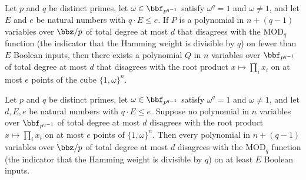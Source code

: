 \begin{theorem}
\label{RazborovSmolensky.padded_modQ_approx_transfers_to_rootProduct}
\leanok
{}
Let $p$ and $q$ be distinct primes, let $\omega \in \bbf_{p^{q-1}}$ satisfy
$\omega^q = 1$ and $\omega \neq 1$, and let $E$ and $e$ be natural numbers with
$q \cdot E \le e$.  If $P$ is a polynomial in $n + (q-1)$ variables over $\bbz/p$ of
total degree at most $d$ that disagrees with the $\mathrm{MOD}_q$ function (the
indicator that the Hamming weight is divisible by $q$) on fewer than $E$ Boolean inputs,
then there exists a polynomial $Q$ in $n$ variables over $\bbf_{p^{q-1}}$ of total
degree at most $d$ that disagrees with the root product $x \mapsto \prod_i x_i$ on at
most $e$ points of the cube $\{1,\omega\}^n$.
\end{theorem}

\begin{theorem}
\label{RazborovSmolensky.modQ_lowDegreeBadCountLB_from_rootProduct}
\leanok
{}
Let $p$ and $q$ be distinct primes, let $\omega \in \bbf_{p^{q-1}}$ satisfy
$\omega^q = 1$ and $\omega \neq 1$, and let $d, E, e$ be natural numbers with
$q \cdot E \le e$.  Suppose no polynomial in $n$ variables over $\bbf_{p^{q-1}}$ of
total degree at most $d$ disagrees with the root product $x \mapsto \prod_i x_i$ on at
most $e$ points of $\{1,\omega\}^n$.  Then every polynomial in $n + (q-1)$ variables
over $\bbz/p$ of total degree at most $d$ disagrees with the $\mathrm{MOD}_q$ function
(the indicator that the Hamming weight is divisible by $q$) on at least $E$ Boolean
inputs.
\end{theorem}

